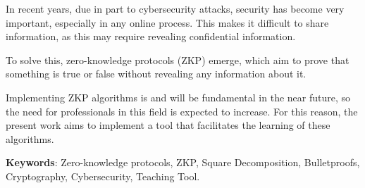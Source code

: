 In recent years, due in part to cybersecurity attacks, security has become very important, especially in any online process. This makes it difficult to share information, as this may require revealing confidential information.

To solve this, zero-knowledge protocols (ZKP) emerge, which aim to prove that something is true or false without revealing any information about it.

Implementing ZKP algorithms is and will be fundamental in the near future, so the need for professionals in this field is expected to increase. For this reason, the present work aims to implement a tool that facilitates the learning of these algorithms.

\vfill

\textbf{Keywords}: Zero-knowledge protocols, ZKP, Square Decomposition, Bulletproofs, Cryptography, Cybersecurity, Teaching Tool.

\blankpage
